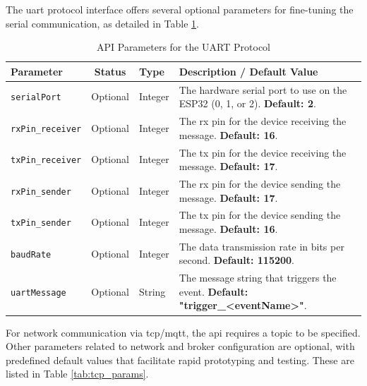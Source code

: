 The \gls{uart} protocol interface offers several optional parameters for fine-tuning the serial communication, as detailed in Table \ref{tab:uart_params}.

\begin{table}[h!]
    \centering
    \caption{API Parameters for the UART Protocol}
    \label{tab:uart_params}
    \begin{tabular}{|l|c|l|p{6cm}|}
        \hline
        \textbf{Parameter} & \textbf{Status} & \textbf{Type} & \textbf{Description / Default Value} \\ \hline
        \texttt{serialPort} & Optional & Integer & The hardware serial port to use on the ESP32 (0, 1, or 2). \textbf{Default: 2}. \\ \hline
        \texttt{rxPin\_receiver} & Optional & Integer & The \gls{rx} pin for the device receiving the message. \textbf{Default: 16}. \\ \hline
        \texttt{txPin\_receiver} & Optional & Integer & The \gls{tx} pin for the device receiving the message. \textbf{Default: 17}. \\ \hline
        \texttt{rxPin\_sender} & Optional & Integer & The \gls{rx} pin for the device sending the message. \textbf{Default: 17}. \\ \hline
        \texttt{txPin\_sender} & Optional & Integer & The \gls{tx} pin for the device sending the message. \textbf{Default: 16}. \\ \hline
        \texttt{baudRate} & Optional & Integer & The data transmission rate in bits per second. \textbf{Default: 115200}. \\ \hline
        \texttt{uartMessage} & Optional & String & The message string that triggers the event. \textbf{Default: "trigger\_<eventName>"}. \\ \hline
    \end{tabular}
\end{table}

For network communication via \gls{tcp}/\gls{mqtt}, the \gls{api} requires a topic to be specified. Other parameters related to network and broker configuration are optional, with predefined default values that facilitate rapid prototyping and testing. These are listed in Table \ref{tab:tcp_params}.

